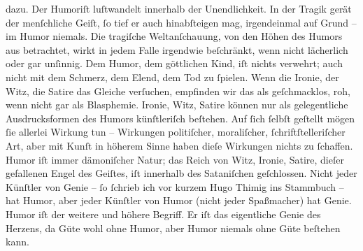 \begin{ledgroupsized}[t]{13cm}
                  dazu.\pend
           \pstart
           Der Humoriſt luſtwandelt innerhalb der Unendlichkeit.\pend
           \pstart
           In der Tragik gerät der menſchliche Geiſt, ſo tief er auch hinabſteigen mag,
                  irgendeinmal auf Grund – im Humor niemals.\pend
           \pstart
           Die tragiſche Weltanſchauung, von den Höhen des Humors aus betrachtet, wirkt in
                  jedem Falle irgendwie beſchränkt, wenn nicht lächerlich oder gar unſinnig.\pend
           \pstart
           Dem Humor, dem göttlichen Kind, iſt nichts verwehrt; auch nicht mit dem Schmerz,
                  dem Elend, dem Tod zu ſpielen. Wenn die Ironie, der Witz, die Satire das Gleiche
                  verſuchen, empfinden wir das als geſchmacklos, roh, wenn nicht gar als
                  Blasphemie.\pend
           \pstart
           Ironie, Witz, Satire können nur als gelegentliche Ausdrucksformen des Humors
                  künſtleriſch beſtehen. Auf ſich ſelbſt geſtellt mögen ſie allerlei Wirkung tun –
                  Wirkungen politiſcher, moraliſcher, ſchriftſtelleriſcher Art, aber mit Kunſt in
                  höherem Sinne haben dieſe Wirkungen nichts zu ſchaffen.\pend
           \pstart
           Humor iſt immer dämoniſcher Natur; das Reich von Witz, Ironie, Satire, dieſer
                  gefallenen Engel des Geiſtes, iſt innerhalb des Sataniſchen geſchlossen.\pend
           \pstart
           Nicht jeder Künſtler von Genie – ſo ſchrieb ich vor kurzem Hugo Thimig ins Stammbuch – hat Humor, aber jeder Künſtler
                  von Humor (nicht jeder Spaßmacher) hat Genie. Humor iſt der weitere und höhere
                  Begriff. Er iſt das eigentliche Genie des Herzens, da Güte wohl ohne Humor, aber
                  Humor niemals ohne Güte beſtehen kann.\pend
           \endnumbering{}\end{ledgroupsized}  \newcommand{\dateiname}{L02442}\newcommand{\titel}{Arthur Schnitzler an Thomas Mann, 7. 6. 1925}\newcommand{\editorInnen}{Martin Anton Müller und Gerd-Hermann Susen}
      